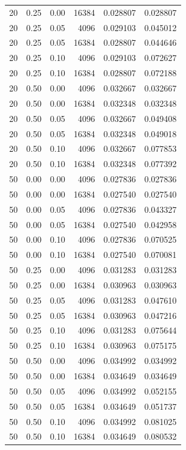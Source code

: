 \begin{longtable}{rrrrrr}
20 & 0.25 & 0.00 & 16384 & 0.028807 & 0.028807\\
20 & 0.25 & 0.05 & 4096 & 0.029103 & 0.045012\\
20 & 0.25 & 0.05 & 16384 & 0.028807 & 0.044646\\
20 & 0.25 & 0.10 & 4096 & 0.029103 & 0.072627\\
20 & 0.25 & 0.10 & 16384 & 0.028807 & 0.072188\\
20 & 0.50 & 0.00 & 4096 & 0.032667 & 0.032667\\
20 & 0.50 & 0.00 & 16384 & 0.032348 & 0.032348\\
20 & 0.50 & 0.05 & 4096 & 0.032667 & 0.049408\\
20 & 0.50 & 0.05 & 16384 & 0.032348 & 0.049018\\
20 & 0.50 & 0.10 & 4096 & 0.032667 & 0.077853\\
20 & 0.50 & 0.10 & 16384 & 0.032348 & 0.077392\\
50 & 0.00 & 0.00 & 4096 & 0.027836 & 0.027836\\
50 & 0.00 & 0.00 & 16384 & 0.027540 & 0.027540\\
50 & 0.00 & 0.05 & 4096 & 0.027836 & 0.043327\\
50 & 0.00 & 0.05 & 16384 & 0.027540 & 0.042958\\
50 & 0.00 & 0.10 & 4096 & 0.027836 & 0.070525\\
50 & 0.00 & 0.10 & 16384 & 0.027540 & 0.070081\\
50 & 0.25 & 0.00 & 4096 & 0.031283 & 0.031283\\
50 & 0.25 & 0.00 & 16384 & 0.030963 & 0.030963\\
50 & 0.25 & 0.05 & 4096 & 0.031283 & 0.047610\\
50 & 0.25 & 0.05 & 16384 & 0.030963 & 0.047216\\
50 & 0.25 & 0.10 & 4096 & 0.031283 & 0.075644\\
50 & 0.25 & 0.10 & 16384 & 0.030963 & 0.075175\\
50 & 0.50 & 0.00 & 4096 & 0.034992 & 0.034992\\
50 & 0.50 & 0.00 & 16384 & 0.034649 & 0.034649\\
50 & 0.50 & 0.05 & 4096 & 0.034992 & 0.052155\\
50 & 0.50 & 0.05 & 16384 & 0.034649 & 0.051737\\
50 & 0.50 & 0.10 & 4096 & 0.034992 & 0.081025\\
50 & 0.50 & 0.10 & 16384 & 0.034649 & 0.080532\\
\bottomrule
\end{longtable}

